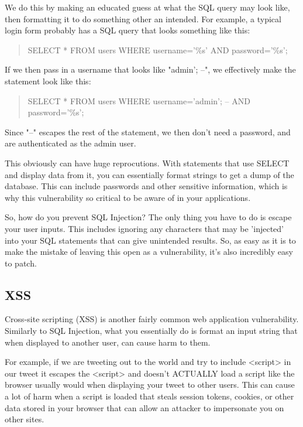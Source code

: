 \documentclass{article}
\begin{document}
We do this by making an educated guess at what the SQL query may look like,
then formatting it to do something other an intended. For example, a typical
login form probably has a SQL query that looks something like this:

\begin{quote}
    SELECT * FROM users WHERE username='\%s' AND password='\%s';
\end{quote}

If we then pass in a username that looks like "admin'; --", we effectively
make the statement look like this:

\begin{quote}
    SELECT * FROM users WHERE username='admin'; -- AND password='\%s';
\end{quote}

Since "--" escapes the rest of the statement, we then don't need a password,
and are authenticated as the admin user.

This obviously can have huge reprocutions. With statements that use SELECT and
display data from it, you can essentially format strings to get a dump of the
database. This can include passwords and other sensitive information, which
is why this vulnerability so critical to be aware of in your applications.

So, how do you prevent SQL Injection? The only thing you have to do is escape
your user inputs. This includes ignoring any characters that may be 'injected'
into your SQL statements that can give unintended results. So, as easy as it
is to make the mistake of leaving this open as a vulnerability, it's also
incredibly easy to patch.

\subsection{XSS}

Cross-site scripting (XSS) is another fairly common web application
vulnerability. Similarly to SQL Injection, what you essentially do is format
an input string that when displayed to another user, can cause harm to them.

For example, if we are tweeting out to the world and try to include <script>
in our tweet it escapes the <script> and doesn't ACTUALLY load a script
like the browser usually would when displaying your tweet to other users. This
can cause a lot of harm when a script is loaded that steals session tokens,
cookies, or other data stored in your browser that can allow an attacker to
impersonate you on other sites. 
\end{document}
